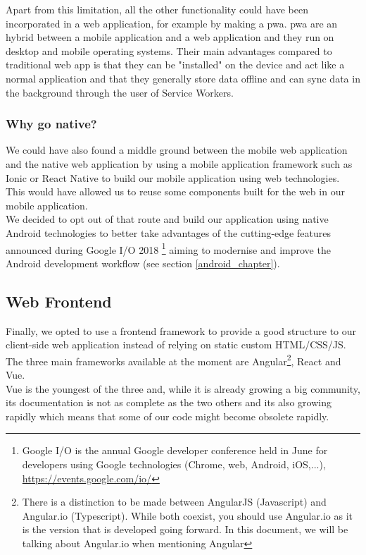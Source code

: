 \documentclass[twoside, openright,11pt,a4paper]{book}
\begin{document}
Apart from this limitation, all the other functionality could have been incorporated in a web application, for example by making a \gls{pwa}\cite{google:pwa:website}. \gls{pwa} are an hybrid between a mobile application and a web application and they run on desktop and mobile operating systems. Their main advantages compared to traditional web app is that they can be "installed" on the device and act like a normal application and that they generally store data offline and can sync data in the background through the user of Service Workers.
\subsubsection{Why go native?}
We could have also found a middle ground between the mobile web application and the native web application by using a mobile application framework such as Ionic or React Native to build our mobile application using web technologies. This would have allowed us to reuse some components built for the web in our mobile application.\\

We decided to opt out of that route and build our application using native Android technologies to better take advantages of the cutting-edge features announced during Google I/O 2018 \footnote{Google I/O is the annual Google developer conference held in June for developers using Google technologies (Chrome, web, Android, iOS,...), \url{https://events.google.com/io/}} aiming to modernise and improve the Android development workflow (see section \ref{android_chapter}).
\subsection{Web Frontend}
Finally, we opted to use a frontend framework to provide a good structure to our client-side web application instead of relying on static custom HTML/CSS/JS.\\

The three main frameworks available at the moment are Angular\footnote{There is a distinction to be made between AngularJS (Javascript) and Angular.io (Typescript). While both coexist, you should use Angular.io as it is the version that is developed going forward. In this document, we will be talking about Angular.io when mentioning Angular}, React and Vue. \\

Vue is the youngest of the three and, while it is already growing a big community, its documentation is not as complete as the two others and its also growing rapidly which means that some of our code might become obsolete rapidly. \\
\end{document}
